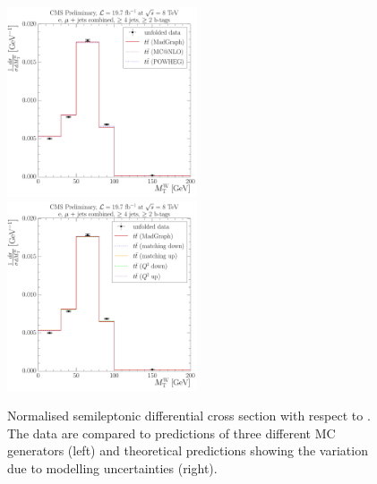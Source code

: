 \begin{figure}[!htbp]
	\centering
  	{\includegraphics[width=0.5\textwidth]{measurement/MT/central/normalised_xsection_combined_different_generators}}\hfill
  	{\includegraphics[width=0.5\textwidth]{measurement/MT/central/normalised_xsection_combined_systematics_shifts}}
    \caption[Normalised semileptonic \ttbar differential cross section with respect to \MT]{Normalised semileptonic
      \ttbar differential cross section with respect to \MT. The data are compared to predictions of three different MC
      generators (left) and theoretical predictions showing the variation due to modelling uncertainties (right).}
    \label{fig:results_MT_combined}
\end{figure}

